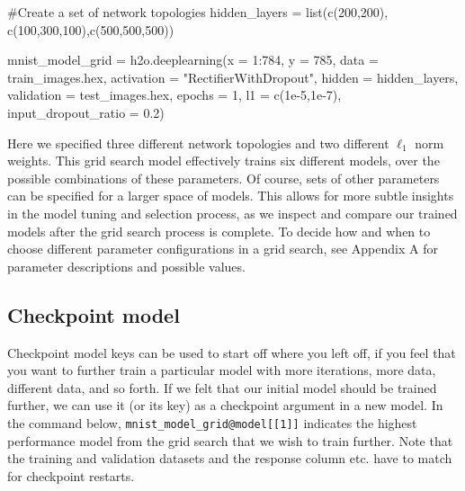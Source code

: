 \documentclass[11pt]{article}
\begin{document}
\begin{spverbatim}
#Create a set of network topologies
hidden_layers = list(c(200,200), c(100,300,100),c(500,500,500))

mnist_model_grid = h2o.deeplearning(x = 1:784, y = 785, data = train_images.hex, activation = "RectifierWithDropout", hidden = hidden_layers, validation = test_images.hex, epochs = 1, l1 = c(1e-5,1e-7), input_dropout_ratio = 0.2)

\end{spverbatim}
\noindent
Here we specified three different network topologies and two different $\ell_1$ norm weights. This grid search model effectively trains six different models, over the possible combinations of these parameters. Of course, sets of other parameters can be specified for a larger space of models. This allows for more subtle insights in the model tuning and selection process, as we inspect and compare our trained models after the grid search process is complete. To decide how and when to choose different parameter configurations in a grid search, see Appendix A for parameter descriptions and possible values.



\subsection{Checkpoint model} \label{3.5}

Checkpoint model keys can be used to start off where you left off, if you feel that you want to further train a particular model with more iterations, more data, different data, and so forth. If we felt that our initial model should be trained further, we can use it (or its key) as a checkpoint argument in a new model.
In the command below, \texttt{mnist\_model\_grid@model[[1]]} indicates the highest performance model from the grid search that we wish to train further. Note that the training and validation datasets and the response column etc. have to match for checkpoint restarts.
\end{document}
